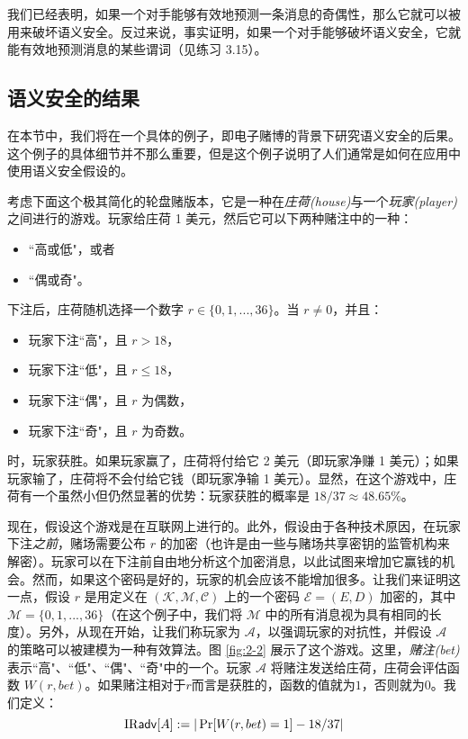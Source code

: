 我们已经表明，如果一个对手能够有效地预测一条消息的奇偶性，那么它就可以被用来破坏语义安全。反过来说，事实证明，如果一个对手能够破坏语义安全，它就能有效地预测消息的某些谓词（见练习 3.15）。

\subsection{语义安全的结果}\label{subsec:2-2-4}

在本节中，我们将在一个具体的例子，即电子赌博的背景下研究语义安全的后果。这个例子的具体细节并不那么重要，但是这个例子说明了人们通常是如何在应用中使用语义安全假设的。

考虑下面这个极其简化的轮盘赌版本，它是一种在\emph{庄荷(house)}与一个\emph{玩家(player)}之间进行的游戏。玩家给庄荷 1 美元，然后它可以下两种赌注中的一种：
\begin{itemize}
	\item ``高或低"，或者
	\item ``偶或奇"。
\end{itemize}
下注后，庄荷随机选择一个数字 $r\in\{0,1,...,36\}$。当 $r\neq 0$，并且：
\begin{itemize}
	\item 玩家下注``高"，且 $r>18$，
	\item 玩家下注``低"，且 $r\leq18$，
	\item 玩家下注``偶"，且 $r$ 为偶数，
	\item 玩家下注``奇"，且 $r$ 为奇数。
\end{itemize}
时，玩家获胜。如果玩家赢了，庄荷将付给它 2 美元（即玩家净赚 1 美元）；如果玩家输了，庄荷将不会付给它钱（即玩家净输 1 美元）。显然，在这个游戏中，庄荷有一个虽然小但仍然显著的优势：玩家获胜的概率是 $18/37\approx48.65\%$。

现在，假设这个游戏是在互联网上进行的。此外，假设由于各种技术原因，在玩家下注\emph{之前}，赌场需要公布 $r$ 的加密（也许是由一些与赌场共享密钥的监管机构来解密）。玩家可以在下注前自由地分析这个加密消息，以此试图来增加它赢钱的机会。然而，如果这个密码是好的，玩家的机会应该不能增加很多。让我们来证明这一点，假设 $r$ 是用定义在 $(\mathcal{K},\mathcal{M},\mathcal{C})$ 上的一个密码 $\mathcal{E}=(E,D)$ 加密的，其中 $\mathcal{M}=\{0,1,...,36\}$（在这个例子中，我们将 $\mathcal{M}$ 中的所有消息视为具有相同的长度）。另外，从现在开始，让我们称玩家为 $\mathcal{A}$，以强调玩家的对抗性，并假设 $\mathcal{A}$ 的策略可以被建模为一种有效算法。图 \ref{fig:2-2} 展示了这个游戏。这里，\emph{赌注(bet)}表示``高"、``低"、``偶"、``奇"中的一个。玩家 $\mathcal{A}$ 将赌注发送给庄荷，庄荷会评估函数 $W(r,bet)$。如果赌注相对于$r$而言是获胜的，函数的值就为$1$，否则就为$0$。我们定义：
$$
{\rm IR\mathsf{adv}}[A]:=|\Pr[W (r,bet)=1]-{18}/{37}|
$$

